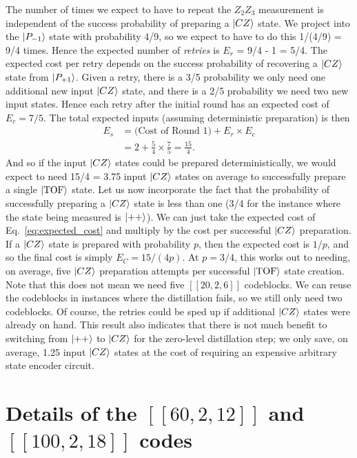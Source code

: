 The number of times we expect to have to repeat the $Z_2Z_3$ measurement is independent of the success probability of preparing a $\ket{CZ}$ state. We project into the $\ket{P_{-1}}$ state with probability 4/9, so we expect to have to do this 1/(4/9) = 9/4 times. Hence the expected number of \textit{retries} is $E_r$ = 9/4 - 1 = 5/4. The expected cost per retry depends on the success probability of recovering a $\ket{CZ}$ state from $\ket{P_{+1}}$. Given a retry, there is a 3/5 probability we only need one additional new input $\ket{CZ}$ state, and there is a 2/5 probability we need two new input states. Hence each retry after the initial round has an expected cost of $E_c = 7/5$. The total expected inputs (assuming deterministic preparation) is then
\begin{align}
    E_s &= (\text{Cost of Round 1)} + E_r \times E_c \nonumber \\ 
        &= 2 + \frac{5}{4} \times \frac{7}{5} = \frac{15}{4}.
        \label{eq:expected_cost}
\end{align}
And so if the input $\ket{CZ}$ states could be prepared deterministically, we would expect to need 15/4 = 3.75 input $\ket{CZ}$ states on average to successfully prepare a single $\ket{\rm TOF}$ state. Let us now incorporate the fact that the probability of successfully preparing a $\ket{CZ}$ state is less than one (3/4 for the instance where the state being measured is $\ket{++}$). We can just take the expected cost of Eq.~\eqref{eq:expected_cost} and multiply by the cost per successful $\ket{CZ}$ preparation. If a $\ket{CZ}$ state is prepared with probability $p$, then the expected cost is $1/p$, and so the final cost is simply $E_C = 15/(4p)$. At $p=3/4$, this works out to needing, on average, five $\ket{CZ}$ preparation attempts per successful $\ket{\rm TOF}$ state creation. Note that this does not mean we need five $[[20,2,6]]$ codeblocks. We can reuse the codeblocks in instances where the distillation fails, so we still only need two codeblocks. Of course, the retries could be sped up if additional $\ket{CZ}$ states were already on hand. This result also indicates that there is not much benefit to switching from $\ket{++}$ to $\ket{CZ}$ for the zero-level distillation step; we only save, on average, 1.25 input $\ket{CZ}$ states at the cost of requiring an expensive arbitrary state encoder circuit.

\section{Details of the $[[60,2,12]]$ and $[[100,2,18]]$ codes}
\label{apx:big_$C_4$-Helix}

